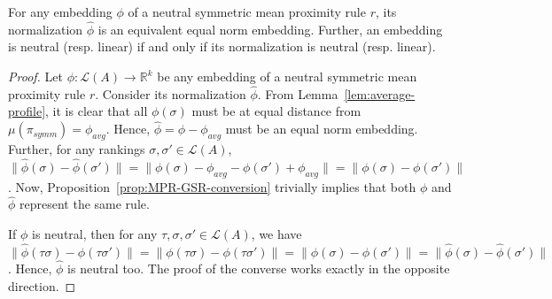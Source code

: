 \documentclass[prodmode,acmec]{ec-acmsmall}
\newcommand{\calL}{{\mathcal{L}}}
\newcommand{\rank}{{\calL(A)}}
\DeclareMathOperator*{\argmin}{arg\,min}
\begin{document}

\begin{lemma}
For any embedding $\phi$ of a neutral symmetric mean proximity rule $r$, its normalization $\hat{\phi}$ is an equivalent equal norm embedding. Further, an embedding is neutral (resp. linear) if and only if its normalization is neutral (resp. linear). 
\label{lem:preservation}
\end{lemma}
\begin{proof}
Let $\phi : \rank \rightarrow \mathbb{R}^k$ be any embedding of a neutral symmetric mean proximity rule $r$. Consider its normalization $\hat{\phi}$. From Lemma~\ref{lem:average-profile}, it is clear that all $\phi(\sigma)$ must be at equal distance from $\mu(\pi_{symm}) = \phi_{avg}$. Hence, $\hat{\phi} = \phi-\phi_{avg}$ must be an equal norm embedding. Further, for any rankings $\sigma, \sigma' \in \rank$, $\|\hat{\phi}(\sigma)-\hat{\phi}(\sigma')\| = \|\phi(\sigma)-\phi_{avg}-\phi(\sigma')+\phi_{avg}\| = \|\phi(\sigma)-\phi(\sigma')\|$. Now, Proposition~\ref{prop:MPR-GSR-conversion} trivially implies that both $\phi$ and $\hat{\phi}$ represent the same rule. 

If $\phi$ is neutral, then for any $\tau,\sigma,\sigma' \in \rank$, we have $\|\hat{\phi}(\tau \sigma)-\hat{\phi}(\tau \sigma')\| = \|\phi(\tau \sigma)-\phi(\tau \sigma')\| = \|\phi(\sigma)-\phi(\sigma')\| = \|\hat{\phi}(\sigma)-\hat{\phi}(\sigma')\|$. Hence, $\hat{\phi}$ is neutral too. The proof of the converse works exactly in the opposite direction.


\end{proof}
\end{document}
